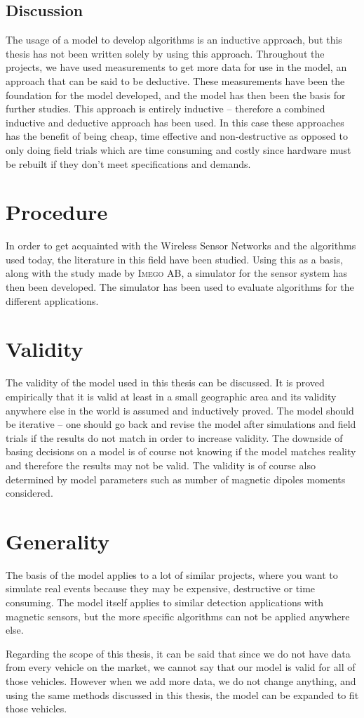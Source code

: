 \subsection{Discussion} %
The usage of a model to develop algorithms is an inductive approach, but this thesis has not been written solely by using this approach. Throughout the projects, we have used measurements to get more data for use in the model, an approach that can be said to be deductive. These measurements have been the foundation for the model developed, and the model has then been the basis for further studies. This approach is entirely inductive -- therefore a combined inductive and deductive approach has been used. In this case these approaches has the benefit of being cheap, time effective and non-destructive as opposed to only doing field trials which are time consuming and costly since hardware must be rebuilt if they don't meet specifications and demands.

\section{Procedure} %
In order to get acquainted with the Wireless Sensor Networks and the algorithms used today, the literature in this field have been studied. Using this as a basis, along with the study made by \textsc{Imego AB}, a simulator for the sensor system has then been developed. The simulator has been used to evaluate algorithms for the different applications.

\section{Validity} %
The validity of the model used in this thesis can be discussed. It is proved empirically that it is valid at least in a small geographic area and its validity anywhere else in the world is assumed and inductively proved. The model should be iterative -- one should go back and revise the model after simulations and field trials if the results do not match in order to increase validity. The downside of basing decisions on a model is of course not knowing if the model matches reality and therefore the results may not be valid. The validity is of course also determined by model parameters such as number of magnetic dipoles moments considered.

\section{Generality} %
The basis of the model applies to a lot of similar projects, where you want to simulate real events because they may be expensive, destructive or time consuming. The model itself applies to similar detection applications with magnetic sensors, but the more specific algorithms can not be applied anywhere else.

Regarding the scope of this thesis, it can be said that since we do not have data from every vehicle on the market, we cannot say that our model is valid for all of those vehicles. However when we add more data, we do not change anything, and using the same methods discussed in this thesis, the model can be expanded to fit those vehicles.